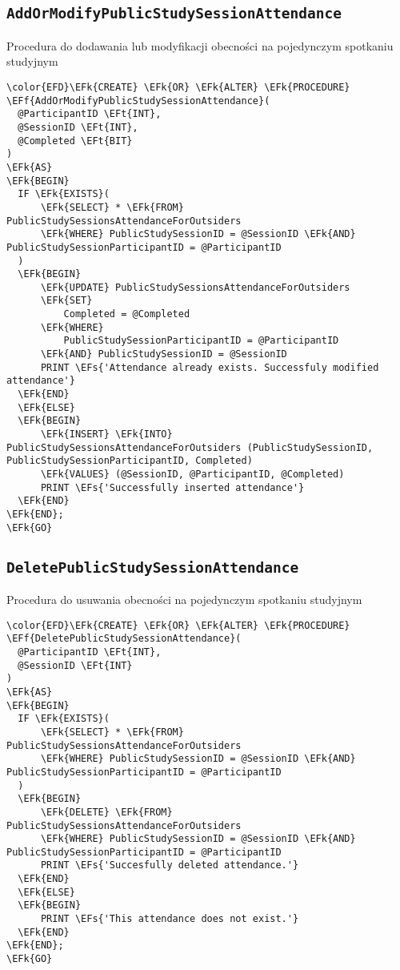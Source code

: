 \documentclass[11pt]{article}
\newcommand{\EFs}[1]{\textcolor{EFs}{#1}} %
\newcommand{\EFk}[1]{\textcolor{EFk}{\textbf{#1}}} %
\newcommand{\EFf}[1]{\textcolor{EFf}{#1}} %
\newcommand{\EFt}[1]{\textcolor{EFt}{\textbf{#1}}} %
\begin{document}
\subsection{\texttt{AddOrModifyPublicStudySessionAttendance}}
\label{sec:org3562463}
Procedura do dodawania lub modyfikacji obecności na pojedynczym spotkaniu studyjnym
\begin{Code}
\begin{Verbatim}
\color{EFD}\EFk{CREATE} \EFk{OR} \EFk{ALTER} \EFk{PROCEDURE} \EFf{AddOrModifyPublicStudySessionAttendance}(
  @ParticipantID \EFt{INT},
  @SessionID \EFt{INT},
  @Completed \EFt{BIT}
)
\EFk{AS}
\EFk{BEGIN}
  IF \EFk{EXISTS}(
      \EFk{SELECT} * \EFk{FROM} PublicStudySessionsAttendanceForOutsiders
      \EFk{WHERE} PublicStudySessionID = @SessionID \EFk{AND} PublicStudySessionParticipantID = @ParticipantID
  )
  \EFk{BEGIN}
      \EFk{UPDATE} PublicStudySessionsAttendanceForOutsiders
      \EFk{SET}
          Completed = @Completed
      \EFk{WHERE}
          PublicStudySessionParticipantID = @ParticipantID
      \EFk{AND} PublicStudySessionID = @SessionID
      PRINT \EFs{'Attendance already exists. Successfuly modified attendance'}
  \EFk{END}
  \EFk{ELSE}
  \EFk{BEGIN}
      \EFk{INSERT} \EFk{INTO} PublicStudySessionsAttendanceForOutsiders (PublicStudySessionID, PublicStudySessionParticipantID, Completed)
      \EFk{VALUES} (@SessionID, @ParticipantID, @Completed)
      PRINT \EFs{'Successfully inserted attendance'}
  \EFk{END}
\EFk{END};
\EFk{GO}
\end{Verbatim}
\end{Code}
\subsection{\texttt{DeletePublicStudySessionAttendance}}
\label{sec:org7699a8c}
Procedura do usuwania obecności na pojedynczym spotkaniu studyjnym
\begin{Code}
\begin{Verbatim}
\color{EFD}\EFk{CREATE} \EFk{OR} \EFk{ALTER} \EFk{PROCEDURE} \EFf{DeletePublicStudySessionAttendance}(
  @ParticipantID \EFt{INT},
  @SessionID \EFt{INT}
)
\EFk{AS}
\EFk{BEGIN}
  IF \EFk{EXISTS}(
      \EFk{SELECT} * \EFk{FROM} PublicStudySessionsAttendanceForOutsiders
      \EFk{WHERE} PublicStudySessionID = @SessionID \EFk{AND} PublicStudySessionParticipantID = @ParticipantID
  )
  \EFk{BEGIN}
      \EFk{DELETE} \EFk{FROM} PublicStudySessionsAttendanceForOutsiders
      \EFk{WHERE} PublicStudySessionID = @SessionID \EFk{AND} PublicStudySessionParticipantID = @ParticipantID
      PRINT \EFs{'Succesfully deleted attendance.'}
  \EFk{END}
  \EFk{ELSE}
  \EFk{BEGIN}
      PRINT \EFs{'This attendance does not exist.'}
  \EFk{END}
\EFk{END};
\EFk{GO}
\end{Verbatim}
\end{Code}
\end{document}
